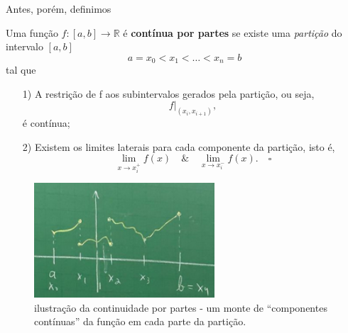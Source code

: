 \documentclass[../pde_notes.tex]{subfiles}
\begin{document}
Antes, porém, definimos
\begin{def*}
	Uma função \(f:[a, b]\rightarrow \mathbb{R}\) é \textbf{contínua por partes} se existe uma \textit{partição} do intervalo \([a, b]\)
	\[
		a=x_{0}<x_{1}<\dotsc <x_{n}=b
	\]
	tal que
	\begin{itemize}
		\item[1)] A restrição de f aos subintervalos gerados pela partição, ou seja,
		      \[
			      f|_{(x_{i}, x_{i+1})},
		      \]
		      é contínua;
		\item[2)] Existem os limites laterais para cada componente da partição, isto é,
		      \[
			      \lim_{x\to x_{i}^{+}}f(x)\quad\&\quad \lim_{x\to x_{i}^{-}}f(x).\quad \square
		      \]
	\end{itemize}
\end{def*}
\begin{figure}[H]
	\begin{center}
		\includegraphics[height=0.6\textheight, width=0.6\textwidth, keepaspectratio]{./Images/squiggles_09.png}
	\end{center}
	\caption{ilustração da continuidade por partes - um monte de ``componentes contínuas'' da função em cada parte da partição.}
	\label{sqgl09}
\end{figure}
\end{document}

